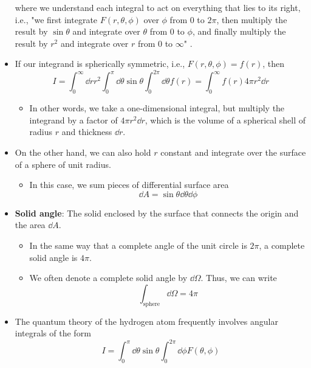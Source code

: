 \documentclass[../notes.tex]{subfiles}
\begin{document}
\begin{itemize}
\begin{equation*}
    \end{equation*}
    where we understand each integral to act on everything that lies to its right, i.e., "we first integrate $F(r,\theta,\phi)$ over $\phi$ from 0 to $2\pi$, then multiply the result by $\sin\theta$ and integrate over $\theta$ from 0 to $\phi$, and finally multiply the result by $r^2$ and integrate over $r$ from 0 to $\infty$" \parencite[150]{bib:McQuarrieSimon}.
    \item If our integrand is spherically symmetric, i.e., $F(r,\theta,\phi)=f(r)$, then
    \begin{equation*}
        I = \int_0^\infty\dd{r}r^2\int_0^\pi\dd{\theta}\sin\theta\int_0^{2\pi}\dd{\theta}f(r)
        = \int_0^\infty f(r)4\pi r^2\dd{r}
    \end{equation*}
    \begin{itemize}
        \item In other words, we take a one-dimensional integral, but multiply the integrand by a factor of $4\pi r^2\dd{r}$, which is the volume of a spherical shell of radius $r$ and thickness $\dd{r}$.
    \end{itemize}
    \item On the other hand, we can also hold $r$ constant and integrate over the surface of a sphere of unit radius.
    \begin{itemize}
        \item In this case, we sum pieces of differential surface area
        \begin{equation*}
            \dd{A} = \sin\theta\dd{\theta}\dd{\phi}
        \end{equation*}
    \end{itemize}
    \item \textbf{Solid angle}: The solid enclosed by the surface that connects the origin and the area $\dd{A}$.
    \begin{itemize}
        \item In the same way that a complete angle of the unit circle is $2\pi$, a complete solid angle is $4\pi$.
        \item We often denote a complete solid angle by $\dd{\Omega}$. Thus, we can write
        \begin{equation*}
            \int_\text{sphere}\dd{\Omega} = 4\pi
        \end{equation*}
    \end{itemize}
    \item The quantum theory of the hydrogen atom frequently involves angular integrals of the form
    \begin{equation*}
        I = \int_0^\pi\dd{\theta}\sin\theta\int_0^{2\pi}\dd{\phi}F(\theta,\phi)
    \end{equation*}
\end{itemize}
\end{document}
